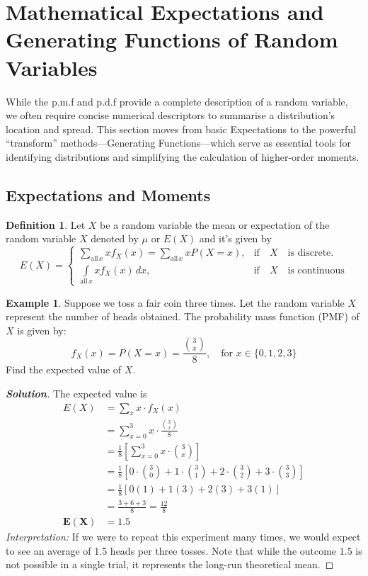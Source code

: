 \documentclass[12pt,a4paper]{report}
\theoremstyle{definition}
\newtheorem{definition}[thm]{Definition}
\newtheorem{example}[thm]{Example}
\theoremstyle{plain}
\theoremstyle{definition}
\begin{document}
\section{Mathematical Expectations and Generating Functions of Random Variables}
While the p.m.f and p.d.f provide a complete description of a random variable, we often require concise numerical descriptors to summarise a distribution's location and spread. This section moves from basic Expectations to the powerful ``transform'' methods—Generating Functions—which serve as essential tools for identifying distributions and simplifying the calculation of higher-order moments.

\subsection{Expectations and Moments}
\vspace{-8pt}
\begin{definition}
Let $X$ be a random variable the mean or expectation of the random variable $X$ denoted by $\mu$ or $E(X)$ and it's given by
\[ E(X)=
\begin{cases}
\sum\limits_{\text{all}\, x}xf_X(x)=\sum\limits_{\text{all}\, x}xP(X=x), & \text{if}\quad X\quad\text{is discrete.}\\[1ex]
\int\limits_{\text{all}\,x}xf_X(x)\, dx, &\text{if}\quad X\quad \text{is continuous}
\end{cases}
\]
\end{definition}





\begin{example}
\label{ex:threetossmean}
Suppose we toss a fair coin three times. Let the random variable $X$ represent the number of heads obtained. The probability mass function (PMF) of $X$ is given by:\[f_X(x) = P(X = x) = \frac{\binom{3}{x}}{8}, \quad \text{for } x \in \{0, 1, 2, 3\}\] Find the expected value of $X$.
\end{example}

\begin{proof}[\textbf{\textit{Solution}}]
The expected value is 
\[\begin{aligned}
E(X) & = \sum_{x} x \cdot f_X(x)\\
&= \sum_{x=0}^{3} x \cdot \frac{\binom{3}{x}}{8} \\
&= \frac{1}{8} \left[ \sum_{x=0}^{3} x \cdot \binom{3}{x} \right] \\
&= \frac{1}{8} \left[ 0 \cdot \binom{3}{0} + 1 \cdot \binom{3}{1} + 2 \cdot \binom{3}{2} + 3 \cdot \binom{3}{3} \right] \\
&= \frac{1}{8} \left[ 0(1) + 1(3) + 2(3) + 3(1) \right] \\
&= \frac{3 + 6 + 3}{8} = \frac{12}{8} \\
\mathbf{E(X)} &\mathbf{= 1.5}
\end{aligned}\]
\textit{Interpretation:} If we were to repeat this experiment many times, we would expect to see an average of 1.5 heads per three tosses. Note that while the outcome $1.5$ is not possible in a single trial, it represents the long-run theoretical mean.
\end{proof}
\end{document}
